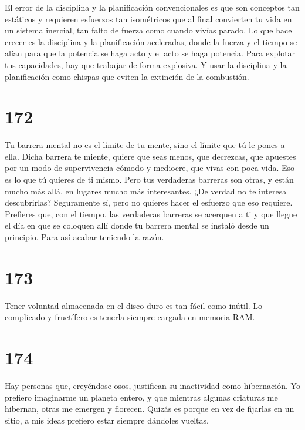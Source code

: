 \documentclass[a4paper,11pt,openright,twocolumn]{book}
\begin{document}
El error de la disciplina y la planificación convencionales es que son conceptos tan estáticos y requieren esfuerzos
tan isométricos que al final convierten tu vida en un sistema inercial, tan falto de fuerza como cuando 
vivías parado. Lo que hace crecer es la disciplina y la planificación aceleradas, donde la fuerza y el tiempo
se alían para que la potencia se haga acto y el acto se haga potencia. Para explotar tus capacidades, hay que trabajar
de forma explosiva. Y usar la disciplina y la planificación como chispas que eviten la extinción de la combustión. 

\section*{172}

Tu barrera mental no es el límite de tu mente, sino el límite que tú le pones a ella. Dicha barrera te miente, 
quiere que seas menos, que decrezcas, que apuestes por un modo de supervivencia cómodo y mediocre, que vivas
con poca vida. Eso es lo que tú quieres de ti mismo. Pero tus verdaderas barreras son otras, y están mucho más
allá, en lugares mucho más interesantes. ¿De verdad no te interesa descubrirlas? Seguramente sí, pero no quieres hacer
el esfuerzo que eso requiere. Prefieres que, con el tiempo, las verdaderas barreras se acerquen a ti y que llegue el
día en que se coloquen allí donde tu barrera mental se instaló desde un principio. Para así acabar teniendo la razón.

\section*{173}

Tener voluntad almacenada en el disco duro es tan fácil como inútil. Lo complicado y fructífero es tenerla
siempre cargada en memoria RAM. 

\section*{174}

Hay personas que, creyéndose osos, justifican su inactividad como hibernación. Yo prefiero imaginarme un
planeta entero, y que mientras algunas criaturas me hibernan, otras me emergen y florecen. Quizás es porque
en vez de fijarlas en un sitio, a mis ideas prefiero estar siempre dándoles vueltas. 
\end{document}

